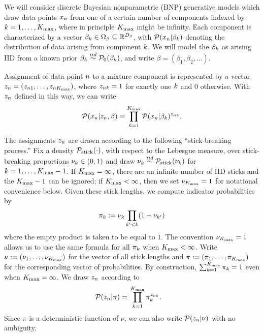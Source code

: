 We will consider discrete Bayesian nonparametric (BNP) generative models which
draw data points $x_n$ from one of a certain number of components indexed by $k =
1, \ldots, {K_{\mathrm{max}}}$, where in principle ${K_{\mathrm{max}}}$ might be infinity.
Each component is characterized by a vector $\beta_k \in \Omega_{\beta} \subseteq
\mathbb{R}^{{D_{\beta}}}$, with $\mathcal{P}(x_n \vert \beta_k)$ denoting the
distribution of data arising from  component $k$. We will model the $\beta_k$
as arising IID from a known prior $\beta_k \overset{iid}{\sim} \mathcal{P}_{0}(\beta_k)$, and write
$\beta = (\beta_1, \beta_2, \ldots)$.

Assignment of data point $n$ to a mixture component is represented by a vector
$z_n = (z_{n1}, \ldots, z_{n{K_{\mathrm{max}}}})$,
where $z_{nk} = 1$ for exactly one $k$ and $0$ otherwise.
With $z_n$ defined in
this way, we can write
%
\begin{align*}
%
\p(\x_n \vert \z_\n, \beta) =
    \prod_{k=1}^\kmax \p(\x_n \vert \beta_\k)^{\z_{\n\k}}.
%
\end{align*}


The assignments $z_{n}$ are drawn according to the following
``stick-breaking process.''  Fix a density $\mathcal{P}_{\mathrm{stick}}(\cdot)$, with respect to the
Lebesgue measure, over stick-breaking proportions $\nu_{k} \in (0, 1)$ and
draw $\nu_{k}\overset{iid}{\sim}\mathcal{P}_{\mathrm{stick}}(\nu_{k})$ for $k=1,\ldots,{K_{\mathrm{max}}} - 1$.  If ${K_{\mathrm{max}}} = \infty$, there are an
infinite number of IID sticks and the ${K_{\mathrm{max}}} - 1$ can be ignored; if ${K_{\mathrm{max}}} <
\infty$, then we set $\nu_{{K_{\mathrm{max}}}} = 1$ for notational convenience below.  Given
these stick lengths, we compute indicator probabilities by
%
\begin{align*}
%
\pi_\k := \nuk \prod_{\k' < \k} (1 - \nu_{\k'})
%
\end{align*}
%
where the empty product is taken to be equal to $1$. The convention $\nu_{{K_{\mathrm{max}}}} =
1$ allows us to use the same formula for all $\pi_k$ when ${K_{\mathrm{max}}} < \infty$.
Write $\nu := (\nu_1, \ldots, \nu_{{K_{\mathrm{max}}}})$ for the vector of all stick lengths
and $\pi := (\pi_1, \ldots, \pi_{K_{\mathrm{max}}})$ for the corresponding vector of
probabilities. By construction, $\sum_{k=1}^{{K_{\mathrm{max}}}} \pi_k = 1$ even when ${K_{\mathrm{max}}} =
\infty$.  We draw $z_n$ according to
%
\begin{align*}
%
\p(\z_\n \vert \pi) ={}&
    \prod_{k=1}^{\kmax} \pi_\k^{\z_{\n\k}}.
%
\end{align*}
%
Since $\pi$ is a deterministic function of $\nu$, we can also write
$\mathcal{P}(z_n \vert \nu)$ with no ambiguity.

